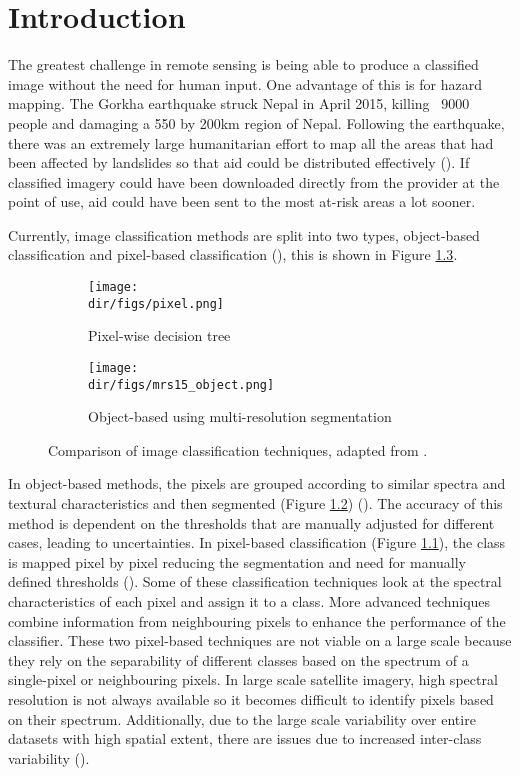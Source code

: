 \chapter{Introduction}

The greatest challenge in remote sensing is being able to produce a classified image without the need for human input. One advantage of this is for hazard mapping. The Gorkha earthquake struck Nepal in April 2015, killing ~9000 people and damaging a 550 by 200km region of Nepal. Following the earthquake, there was an extremely large humanitarian effort to map all the areas that had been affected by landslides so that aid could be distributed effectively (\cite{kargel16}). If classified imagery could have been downloaded directly from the provider at the point of use, aid could have been sent to the most at-risk areas a lot sooner.
\par
Currently, image classification methods are split into two types, object-based classification and pixel-based classification (\cite{chen18}), this is shown in Figure \ref{fig.pix_vs_obj}. 
\begin{figure}[htpb]

\centering
\begin{subfigure}{0.35\textwidth}
\texttt{[image: \\dir/figs/pixel.png]}
\caption{Pixel-wise decision tree}
\label{fig.pixel-based}
\end{subfigure}%
\qquad
\begin{subfigure}{0.35\textwidth}
\texttt{[image: \\dir/figs/mrs15\_object.png]}
\caption{Object-based using multi-resolution segmentation}
\label{fig.object-based}
\end{subfigure}
\caption{Comparison of image classification techniques, adapted from \cite{duro12}.}
\label{fig.pix_vs_obj}
\end{figure}
In object-based methods, the pixels are grouped according to similar spectra and textural characteristics and then segmented (Figure \ref{fig.object-based}) (\cite{martha11}). The accuracy of this method is dependent on the thresholds that are manually adjusted for different cases, leading to uncertainties. In pixel-based classification (Figure \ref{fig.pixel-based}), the class is mapped pixel by pixel reducing the segmentation and need for manually defined thresholds (\cite{hussain13}). Some of these classification techniques look at the spectral characteristics of each pixel and assign it to a class. More advanced techniques combine information from neighbouring pixels to enhance the performance of the classifier. These two pixel-based techniques are not viable on a large scale because they rely on the separability of different classes based on the spectrum of a single-pixel or neighbouring pixels. In large scale satellite imagery, high spectral resolution is not always available so it becomes difficult to identify pixels based on their spectrum. Additionally, due to the large scale variability over entire datasets with high spatial extent, there are issues due to increased inter-class variability (\cite{maggiori17b}).
